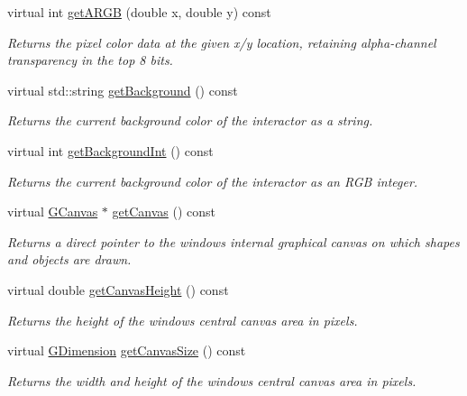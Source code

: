 \begin{DoxyCompactItemize}
virtual int \mbox{\hyperlink{classGDrawingSurface_ae394d39f20476570e083918d991c25bd}{get\+A\+R\+GB}} (double x, double y) const
\begin{DoxyCompactList}\small\item\em Returns the pixel color data at the given x/y location, retaining alpha-\/channel transparency in the top 8 bits. \end{DoxyCompactList}\item 
virtual std\+::string \mbox{\hyperlink{classGDrawingSurface_a808e22cc1fdfbecf71ed8c64ef4600e0}{get\+Background}} () const
\begin{DoxyCompactList}\small\item\em Returns the current background color of the interactor as a string. \end{DoxyCompactList}\item 
virtual int \mbox{\hyperlink{classGDrawingSurface_a9e827257a55cb8cf4d9de2ec6bcfd7a0}{get\+Background\+Int}} () const
\begin{DoxyCompactList}\small\item\em Returns the current background color of the interactor as an R\+GB integer. \end{DoxyCompactList}\item 
virtual \mbox{\hyperlink{classGCanvas}{G\+Canvas}} $\ast$ \mbox{\hyperlink{classGWindow_a7aed3237105aa56033642252b3b1445e}{get\+Canvas}} () const
\begin{DoxyCompactList}\small\item\em Returns a direct pointer to the window\textquotesingle{}s internal graphical canvas on which shapes and objects are drawn. \end{DoxyCompactList}\item 
virtual double \mbox{\hyperlink{classGWindow_abd8bb28e2ac85d1b474db3f17f65115e}{get\+Canvas\+Height}} () const
\begin{DoxyCompactList}\small\item\em Returns the height of the window\textquotesingle{}s central canvas area in pixels. \end{DoxyCompactList}\item 
virtual \mbox{\hyperlink{structGDimension}{G\+Dimension}} \mbox{\hyperlink{classGWindow_a7d095192cefa2d9acf8fcf1cd00386c4}{get\+Canvas\+Size}} () const
\begin{DoxyCompactList}\small\item\em Returns the width and height of the window\textquotesingle{}s central canvas area in pixels. \end{DoxyCompactList}\item 

\end{DoxyCompactItemize}
